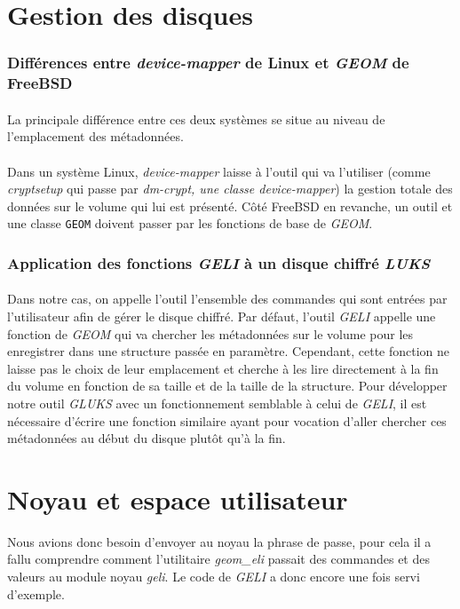 \section{Gestion des disques}

\subsubsection{Différences entre \textit{device-mapper} de Linux et
  \textit{GEOM} de FreeBSD}
\paragraph{}
La principale différence entre ces deux systèmes se situe au niveau de
l'emplacement des métadonnées.
\paragraph{}
Dans un système Linux, \textit{device-mapper} laisse à l'outil qui va l'utiliser
(comme \textit{cryptsetup} qui passe par \textit{dm-crypt, une classe
  \textit{device-mapper}}) la gestion totale des données sur le volume qui lui
est présenté. Côté FreeBSD en revanche, un outil et une classe \texttt{GEOM}
doivent passer par les fonctions de base de \textit{GEOM}.

\subsubsection{Application des fonctions \textit{GELI} à un disque chiffré \textit{LUKS}}
\paragraph{}
Dans notre cas, on appelle l'outil l'ensemble des commandes qui sont entrées par
l'utilisateur afin de gérer le disque chiffré. Par défaut, l'outil \textit{GELI}
appelle une fonction de \textit{GEOM} qui va chercher les métadonnées sur le
volume pour les enregistrer dans une structure passée en paramètre. Cependant,
cette fonction ne laisse pas le choix de leur emplacement et cherche à les lire
directement à la fin du volume en fonction de sa taille et de la taille de la
structure. Pour développer notre outil \textit{GLUKS} avec un fonctionnement
semblable à celui de \textit{GELI}, il est nécessaire d'écrire une fonction
similaire ayant pour vocation d'aller chercher ces métadonnées au début du
disque plutôt qu'à la fin.

\section{Noyau et espace utilisateur}
Nous avions donc besoin d'envoyer au noyau la phrase de passe, pour cela il a
fallu comprendre comment l'utilitaire {\em geom\_eli} passait des commandes et
des valeurs au module noyau {\em geli}. Le code de {\em GELI} a donc encore une
fois servi d'exemple.

